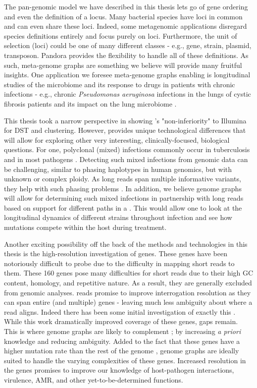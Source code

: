 \noindent
The pan-genomic model we have described in this thesis lets go of gene ordering and even the definition of a locus. Many bacterial species have loci in common and can even share these loci. Indeed, some metagenomic applications disregard species definitions entirely and focus purely on loci. Furthermore, the unit of selection (loci) could be one of many different classes - e.g., gene, strain, plasmid, transposon. Pandora provides the flexibility to handle all of these definitions. As such, meta-genome graphs are something we believe will provide many fruitful insights. One application we foresee meta-genome graphs enabling is longitudinal studies of the microbiome and its response to drugs in patients with chronic infections - e.g., chronic \textit{Pseudomonas aeruginosa} infections in the lungs of cystic fibrosis patients and its impact on the lung microbiome \cite{Boutin2017Chronic}.


\noindent
This thesis took a narrow perspective in showing \ont{}'s "non-inferiority" to Illumina for \mtb{} DST and clustering. However, \ont{} provides unique technological differences that will allow for exploring other very interesting, clinically-focused, biological questions. For one, polyclonal (mixed) infections commonly occur in tuberculosis \cite{Cohen2012} and in most pathogens \cite{Balmer2011}. Detecting such mixed infections from genomic data can be challenging, similar to phasing haplotypes in human genomics, but with unknown or complex ploidy. As long \ont{} reads span multiple informative variants, they help with such phasing problems \cite{Patterson2015WhatsHap}. In addition, we believe genome graphs will allow for determining such mixed infections in partnership with long reads based on support for different paths in a \prg{}. This would allow one to look at the longitudinal dynamics of different strains throughout infection and see how mutations compete within the host during treatment. 

Another exciting possibility off the back of the methods and technologies in this thesis is the high-resolution investigation of \ppe{} genes. These genes have been notoriously difficult to probe due to the difficulty in mapping short reads to them. These 160 genes pose many difficulties for short reads due to their high GC content, homology, and repetitive nature. As a result, they are generally excluded from genomic analyses. \ont{} reads promise to improve interrogation resolution as they can span entire (and multiple) \ppe{} genes - leaving much less ambiguity about where a read aligns. Indeed there has been some initial investigation of exactly this \cite{bainomugisa2018}. While this work dramatically improved coverage of these genes, gaps remain. This is where genome graphs are likely to complement \ont{}; by increasing \textit{a priori} knowledge and reducing ambiguity. Added to the fact that these genes have a higher mutation rate than the rest of the genome \cite{bainomugisa2018}, genome graphs are ideally suited to handle the varying complexities of these genes. Increased resolution in the \ppe{} genes promises to improve our knowledge of \mtb{} host-pathogen interactions, virulence, AMR, and other yet-to-be-determined functions.

